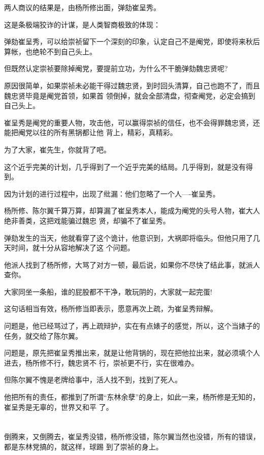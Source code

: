 \documentclass[11pt,a4paper,onecolumn]{article}
\begin{document}
两人商议的结果是，由杨所修出面，弹劾崔呈秀。

这是条极端狡诈的计谋，是人类智商极致的体现：

弹劾崔呈秀，可以给崇祯留下一个深刻的印象，认定自己不是阉党，即使将来秋后算帐，也绝轮不到自己头上。

但既然认定崇祯要除掉阉党，要提前立功，为什么不干脆弹劾魏忠贤呢?

原因很简单，如果崇祯未必能干得过魏忠贤，到时回头清算，自己也跑不了，而且魏忠贤毕竟是阉党首领，如果首
领倒掉，就会全部清盘，彻查阉党，必定会搞到自己头上。

崔呈秀是阉党的重要人物，攻击他，可以赢得崇祯的信任，也不会得罪魏忠贤，还能把阉党以往的所有黑锅都让他
背上，精彩，真精彩。

为了大家，崔先生，你就背了吧。

这个近乎完美的计划，几乎得到了一个近乎完美的结局。几乎得到，就是没有得到。

因为计划的进行过程中，出现了纰漏：他们忽略了一个人----崔呈秀。

杨所修、陈尔翼千算万算，却算漏了崔呈秀本人，能成为阉党的头号人物，崔大人绝非善类，这把戏能骗过魏忠
贤，却骗不了崔呈秀。

弹劾发生的当天，他就看穿了这个诡计，他意识到，大祸即将临头。但他只用了几天时间，就十分从容地解决了这
个问题。

他派人找到了杨所修，大骂了对方一顿，最后说，如果你不尽快了结此事，就派人查你。

大家同坐一条船，谁的屁股都不干净，敢玩阴的，大家就一起完蛋!

这句话相当有效，杨所修当即表示，愿意再次上疏，为崔呈秀辩解。

问题是，他已经骂过了，再上疏辩护，实在有点婊子的感觉，所以，这个当婊子的任务，就交给了陈尔翼。

问题是，原先把崔呈秀推出来，就是让他背锅的，现在把他拉出来，就必须填个人进去，杨所修不行，魏忠贤不
行，崇祯更不行，实在很难办。

但陈尔翼不愧是老牌给事中，活人找不到，找到了死人。

他把所有的责任，都推到了所谓``东林余孽''的身上，如此一来，杨所修是无知的，崔呈秀是无辜的，世界又和平
了。

\section[\thesection]{}

倒腾来，又倒腾去，崔呈秀没错，杨所修没错，陈尔翼当然也没错，所有的错误，都是东林党搞的，就这样，球踢
到了崇祯的身上。
\end{document}
